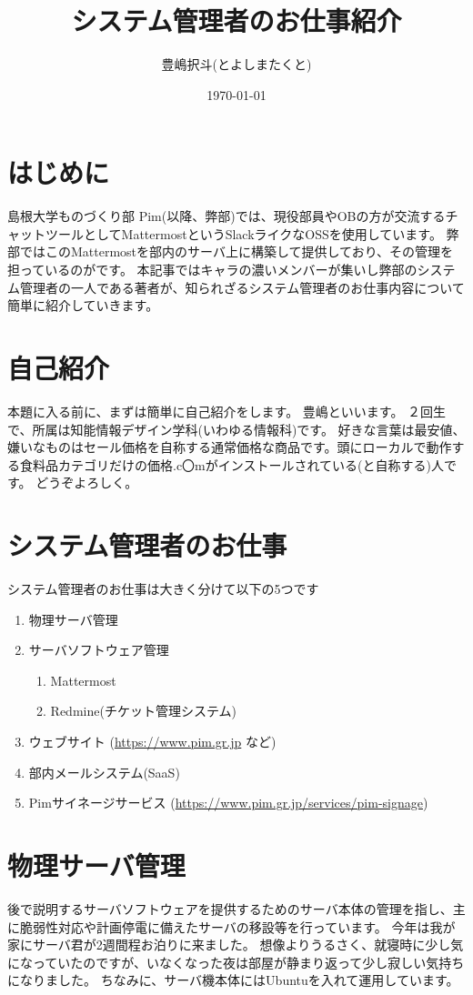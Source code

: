 \documentclass[a4paper,11pt]{jsarticle}
\begin{document}
\title{システム管理者のお仕事紹介}
\author{豊嶋択斗(とよしまたくと)}
\date{\today}
\maketitle

\section{はじめに}
島根大学ものづくり部 Pim(以降、弊部)では、現役部員やOBの方が交流するチャットツールとしてMattermostというSlackライクなOSSを使用しています。
弊部ではこのMattermostを部内のサーバ上に構築して提供しており、その管理を担っているのがです。
本記事ではキャラの濃いメンバーが集いし弊部のシステム管理者の一人である著者が、知られざるシステム管理者のお仕事内容について簡単に紹介していきます。

\section{自己紹介}
本題に入る前に、まずは簡単に自己紹介をします。
豊嶋といいます。
２回生で、所属は知能情報デザイン学科(いわゆる情報科)です。
好きな言葉は最安値、嫌いなものはセール価格を自称する通常価格な商品です。頭にローカルで動作する食料品カテゴリだけの価格.c〇mがインストールされている(と自称する)人です。
どうぞよろしく。

\section{システム管理者のお仕事}
システム管理者のお仕事は大きく分けて以下の5つです
\begin{enumerate}
  \item 物理サーバ管理
  \item サーバソフトウェア管理
    \begin{enumerate}
      \item Mattermost
      \item Redmine(チケット管理システム)
    \end{enumerate}
  \item ウェブサイト (\url{https://www.pim.gr.jp} など)
  \item 部内メールシステム(SaaS)
  \item Pimサイネージサービス (\url{https://www.pim.gr.jp/services/pim-signage})
\end{enumerate}

\section{物理サーバ管理}
後で説明するサーバソフトウェアを提供するためのサーバ本体の管理を指し、主に脆弱性対応や計画停電に備えたサーバの移設等を行っています。
今年は我が家にサーバ君が2週間程お泊りに来ました。
想像よりうるさく、就寝時に少し気になっていたのですが、いなくなった夜は部屋が静まり返って少し寂しい気持ちになりました。
ちなみに、サーバ機本体にはUbuntuを入れて運用しています。
\end{document}
